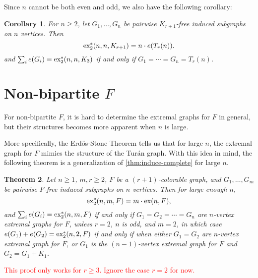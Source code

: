 \documentclass[12pt]{report}
\newtheorem{theorem}{Theorem}[chapter]
\newtheorem{corollary}[theorem]{Corollary}
\newcommand*{\ex}{\textnormal{ex}}
\newcommand*{\dex}{\textnormal{ex}_2}
\begin{document}
Since $n$ cannot be both even and odd, we also have the following corollary:

\begin{corollary}\label{cor:induce-complete}
  For $n \geq 2$, let $G_1, \ldots, G_n$ be pairwise $K_{r + 1}$-free induced subgraphs on $n$ vertices. Then
  \[
    \dex^*(n, n, K_{r + 1}) = n \cdot e(T_r(n)).
  \]
  and $\sum_i e(G_i) = \dex^*(n, n, K_3)$ if and only if $G_1 = \cdots = G_n = T_r(n)$.
\end{corollary}

\section{Non-bipartite $F$}

For non-bipartite $F$, it is hard to determine the extremal graphs for $F$ in general, but their structures becomes more apparent when $n$ is large. 

More specifically, the Erdős-Stone Theorem tells us that for large $n$, the extremal graph for $F$ mimics the structure of the Turán graph. With this idea in mind, the following theorem is a generalization of \cref{thm:induce-complete} for large $n$.

\begin{theorem}
  Let $n \geq 1$, $m, r \geq 2$, $F$ be a $(r + 1)$-colorable graph, and $G_1, \ldots, G_m$ be pairwise $F$-free induced subgraphs on $n$ vertices. Then for large enough $n$,
  \[
    \dex^*(n, m, F) = m \cdot \ex(n, F),
  \]
  and $\sum_i e(G_i) = \dex^*(n, m, F)$ if and only if $G_1 = G_2 = \cdots = G_n$ are $n$-vertex extremal graphs for $F$, unless $r = 2$, $n$ is odd, and $m = 2$, in which case $e(G_1) + e(G_2) = \dex^*(n, 2, F)$ if and only if when either $G_1 = G_2$ are $n$-vertex extremal graph for $F$, or $G_{1}$ is the $(n - 1)$-vertex extremal graph for $F$ and $G_{2} = G_1 + K_1$.
\end{theorem}

\textcolor{red}{This proof only works for $r \geq 3$. Ignore the case $r = 2$ for now.}
\end{document}

